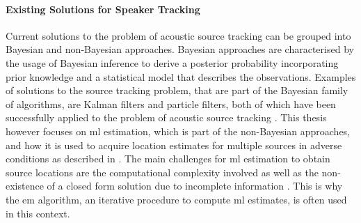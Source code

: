 \paragraph{Existing Solutions for Speaker Tracking}
Current solutions to the problem of acoustic source tracking can be grouped into Bayesian and non-Bayesian approaches. Bayesian approaches are characterised by the usage of Bayesian inference to derive a posterior probability incorporating prior knowledge and a statistical model that describes the observations. Examples of solutions to the source tracking problem, that are part of the Bayesian family of algorithms, are Kalman filters \cite{Kalman1960} and particle filters, both of which have been successfully applied to the problem of acoustic source tracking \cite{Gannot2012,Lehmann2007}. This thesis however focuses on \gls{ml} estimation, which is part of the non-Bayesian approaches, and how it is used to acquire location estimates for multiple sources in adverse conditions as described in \cite{Schwartz2014}. The main challenges for \gls{ml} estimation to obtain source locations are the computational complexity involved as well as the non-existence of a closed form solution due to incomplete information \cite[p.~1692]{Dorfan2015}. This is why the \gls{em} algorithm, an iterative procedure to compute \gls{ml} estimates, is often used in this context.
